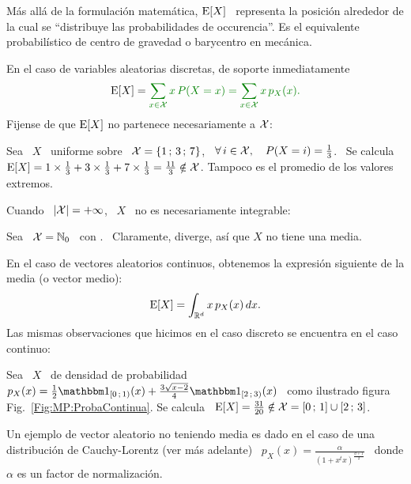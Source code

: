 M\'as  all\'a  de  la formulaci\'on  matem\'atica,
$\operatorname{E}[X]$ \  representa la posici\'on alrededor  de la cual  se ``distribuye las
probabilidades de occurencia''. Es  el equivalente probabil\'istico de centro de
gravedad o barycentro en mec\'anica.

En el  caso de variables  aleatorias discretas, de soporte   inmediatamente
%
\[
\Esp[X] = \modif{\sum_{x \in \X} x \, P(X = x) = \sum_{x \in \X} x \, p_X(x).}
\]
%
\noindent  Fijense de  que $\operatorname{E}[X]$  no partenece  necesariamente a  $\mathcal{X}$:
%
\begin{ejemplo}
\label{Ej:MP:Uniforme3Estados}
%
  Sea \  $X$ \  uniforme sobre \  $\mathcal{X} = \{  1 \, ; \, 3  \, ; \, 7 \}$,  \ie \
  $\forall \,  i \in \mathcal{X}, \quad  P(X = i) =  \frac13$. \ Se calcula  $\operatorname{E}[X] = 1
  \times \frac13  + 3 \times \frac13  + 7 \times \frac13  = \frac{11}{3} \notin
  \mathcal{X}$.  Tampoco es el promedio de los valores extremos.
\end{ejemplo}
%
\noindent Cuando \ $|\mathcal{X}| = +\infty$, \ $X$ \ no es necesariamente integrable:
%
\begin{ejemplo}
\label{Ej:MP:DiscretaSinMedia}
%
Sea  \ $\mathcal{X}  = \mathbb{N}_0$  \ con  . \
Claramente,  diverge, as\'i que $X$ no tiene
una media.
\end{ejemplo}

En el caso de vectores  aleatorios continuos, obtenemos la expresi\'on siguiente
de la media (o vector medio):
%
\[
\operatorname{E}[X] = \int_{\mathbb{R}^d} x \, p_X(x) \, dx.
\]
%
\noindent Las mismas observaciones que  hicimos en el caso discreto se encuentra
en el caso continuo:
%
\begin{ejemplo}
\label{Ej:MP:MediaNoEnX}
%
Sea \ $X$ \ de densidad de  probabilidad \ $p_X(x) = \frac12 \un_{[0 \; 1)}(x) +
\frac{3   \sqrt{x-2}}{4}   \un_{[2   \;   3)}(x)$  \   como   ilustrado   figura
Fig.~\ref{Fig:MP:ProbaContinua}.
Se calcula \ $\operatorname{E}[X] = \frac{31}{20} \notin \mathcal{X} = [0 \, ; \, 1] \cup [2 \, ; \, 3]$.
\end{ejemplo}
%
\begin{ejemplo}
\label{Ej:MP:VariableCauchySinMedia}
%
  Un ejemplo  de vector aleatorio no  teniendo media es  dado en el caso  de una
  distribuci\'on de Cauchy-Lorentz (ver  m\'as adelante) \ $\displaystyle p_X(x)
  = \frac{\alpha}{\left( 1 + x^t x \right)^{\frac{d+1}{2}}}$ \ donde $\alpha$ es
  un factor de normalizaci\'on.
\end{ejemplo}

